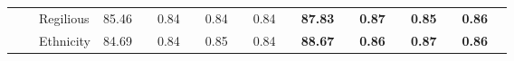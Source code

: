 \begin{table}[!tbh]
{\begin{tabular}{l|l|l|llllllll||llllllll}
                                                                                               &                                  & Regilious                & \multicolumn{1}{l|}{85.46} & \multicolumn{1}{l|}{}                        & \multicolumn{1}{l|}{0.84} & \multicolumn{1}{l|}{}                       & \multicolumn{1}{l|}{0.84} & \multicolumn{1}{l|}{}                       & \multicolumn{1}{l|}{0.84} &                        & \multicolumn{1}{l|}{\cellcolor[HTML]{FFFE65}\textbf{87.83}} & \multicolumn{1}{l|}{\cellcolor[HTML]{FFFE65}}                                 & \multicolumn{1}{l|}{\cellcolor[HTML]{FFFE65}\textbf{0.87}} & \multicolumn{1}{l|}{\cellcolor[HTML]{FFFE65}}                                & \multicolumn{1}{l|}{\cellcolor[HTML]{FFFE65}\textbf{0.85}} & \multicolumn{1}{l|}{\cellcolor[HTML]{FFFE65}}                                & \multicolumn{1}{l|}{\cellcolor[HTML]{FFFE65}\textbf{0.86}} & \cellcolor[HTML]{FFFE65}                                \\ \cline{3-4} \cline{6-6} \cline{8-8} \cline{10-10} \cline{12-12} \cline{14-14} \cline{16-16} \cline{18-18}
                                                                                               &                                  & Ethnicity                & \multicolumn{1}{l|}{84.69} & \multicolumn{1}{l|}{}                        & \multicolumn{1}{l|}{0.84} & \multicolumn{1}{l|}{}                       & \multicolumn{1}{l|}{0.85} & \multicolumn{1}{l|}{}                       & \multicolumn{1}{l|}{0.84} &                        & \multicolumn{1}{l|}{\cellcolor[HTML]{FFFE65}\textbf{88.67}} & \multicolumn{1}{l|}{\cellcolor[HTML]{FFFE65}}                                 & \multicolumn{1}{l|}{\cellcolor[HTML]{FFFE65}\textbf{0.86}} & \multicolumn{1}{l|}{\cellcolor[HTML]{FFFE65}}                                & \multicolumn{1}{l|}{\cellcolor[HTML]{FFFE65}\textbf{0.87}} & \multicolumn{1}{l|}{\cellcolor[HTML]{FFFE65}}                                & \multicolumn{1}{l|}{\cellcolor[HTML]{FFFE65}\textbf{0.86}} & \cellcolor[HTML]{FFFE65}                                \\ \cline{3-4} \cline{6-6} \cline{8-8} \cline{10-10} \cline{12-12} \cline{14-14} \cline{16-16} \cline{18-18}

\end{tabular}}
\end{table}
